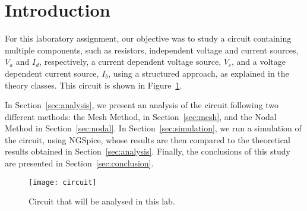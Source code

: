 \section{Introduction}
\label{sec:introduction}


For this laboratory assignment, our objective was to study a circuit containing multiple components, such as resistors, independent voltage and current sources, $V_a$ and  $I_d$, respectively, a current dependent voltage source, $V_c$, and a voltage dependent current source, $I_b$, using a structured approach, as explained in the theory classes.
This circuit is shown in Figure~\ref{fig:circuit}.

In Section~\ref{sec:analysis}, we present an analysis of the circuit following two different methods: the Mesh Method, in Section~\ref{sec:mesh}, and the Nodal Method in Section~\ref{sec:nodal}. 
In Section~\ref{sec:simulation}, we run a simulation of the circuit, using NGSpice, whose results are then compared to the theoretical results obtained in
Section~\ref{sec:analysis}. Finally, the conclusions of this study are presented in
Section~\ref{sec:conclusion}.

\begin{figure}[h] \centering
\texttt{[image: circuit]}
\caption{Circuit that will be analysed in this lab.}
\label{fig:circuit}
\end{figure}

